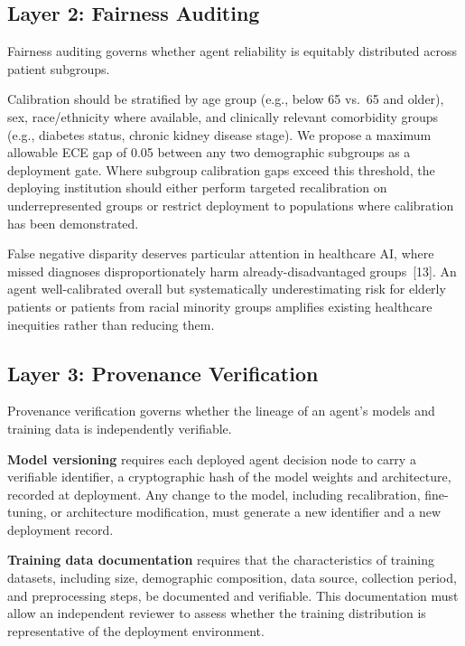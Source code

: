 \documentclass[11pt]{article}
\begin{document}
\subsection{Layer 2: Fairness Auditing}\label{layer-2-fairness-auditing}

Fairness auditing governs whether agent reliability is equitably
distributed across patient subgroups.

Calibration should be stratified by age group (e.g., below 65 vs.~65
and older), sex, race/ethnicity where available, and clinically relevant
comorbidity groups (e.g., diabetes status, chronic kidney disease
stage). We propose a maximum allowable ECE gap of 0.05 between any two
demographic subgroups as a deployment gate. Where subgroup calibration
gaps exceed this threshold, the deploying institution should either
perform targeted recalibration on underrepresented groups or restrict
deployment to populations where calibration has been demonstrated.

False negative disparity deserves particular attention in healthcare AI,
where missed diagnoses disproportionately harm already-disadvantaged
groups~{[}13{]}. An agent well-calibrated overall but systematically
underestimating risk for elderly patients or patients from racial
minority groups amplifies existing healthcare inequities rather than
reducing them.

\subsection{Layer 3: Provenance Verification}\label{layer-3-provenance-verification}

Provenance verification governs whether the lineage of an agent's models
and training data is independently verifiable.

\textbf{Model versioning} requires each deployed agent decision node to
carry a verifiable identifier, a cryptographic hash of the model weights
and architecture, recorded at deployment. Any change to the model,
including recalibration, fine-tuning, or architecture modification, must
generate a new identifier and a new deployment record.

\textbf{Training data documentation} requires that the characteristics
of training datasets, including size, demographic composition, data
source, collection period, and preprocessing steps, be documented and
verifiable. This documentation must allow an independent reviewer to
assess whether the training distribution is representative of the
deployment environment.
\end{document}
